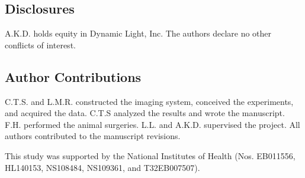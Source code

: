 \documentclass[12pt]{spieman}
\begin{document}
\begin{spacing}{2}
\subsection*{Disclosures}
A.K.D. holds equity in Dynamic Light, Inc. The authors declare no other conflicts of interest.

\subsection*{Author Contributions}
C.T.S. and L.M.R. constructed the imaging system, conceived the experiments, and acquired the data. C.T.S analyzed the results and wrote the manuscript. F.H. performed the animal surgeries. L.L. and A.K.D. supervised the project. All authors contributed to the manuscript revisions.

\acknowledgments
This study was supported by the National Institutes of Health (Nos. EB011556, HL140153, NS108484, NS109361, and T32EB007507).





\end{spacing}
\end{document}
